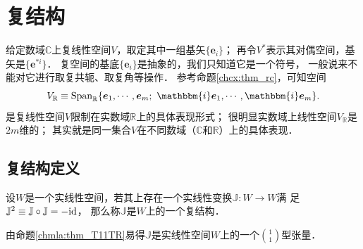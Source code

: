 \section{复结构}\label{chcx:sec_cpstru}
给定数域$\mathbb{C}$上复线性空间$V$，取定其中一组基矢$\{\boldsymbol{e}_i\}$；
再令$V^*$表示其对偶空间，基矢是$\{\boldsymbol{e}^{*i}\}$．
复空间的基底$\{\boldsymbol{e}_i\}$是抽象的，我们只知道它是一个符号，
一般说来不能对它进行取复共轭、取复角等操作．
参考命题\ref{chcx:thm_rc}，可知空间
\begin{equation}\label{chcx:eqn_VR}
    V_{\mathbb{R}} \equiv {\rm Span}_{\mathbb{R}}\{\boldsymbol{e}_1,\cdots,\boldsymbol{e}_m;\  
    \mathbbm{i}\boldsymbol{e}_1,\cdots,\mathbbm{i}\boldsymbol{e}_m\} .
\end{equation}
是复线性空间$V$限制在实数域$\mathbb{R}$上的具体表现形式；
很明显实数域上线性空间$V_{\mathbb{R}}$是$2m$维的；
其实就是同一集合$V$在不同数域（$\mathbb{C}$和$\mathbb{R}$）上的具体表现．

\subsection{复结构定义}



\begin{definition}
    设$W$是一个实线性空间，若其上存在一个实线性变换$\mathbb{J}:W\to W$满
    足$\mathbb{J}^2\equiv \mathbb{J}\circ \mathbb{J}=-{\rm id}$，
    那么称$\mathbb{J}$是$W$上的一个{\heiti 复结构}．
\end{definition}
由命题\ref{chmla:thm_T11TR}易得$\mathbb{J}$是实线性空间$W$上的一个$\binom{1}{1}$型张量．


